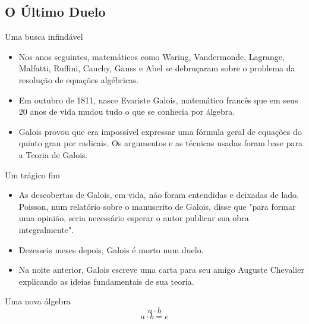 \documentclass[article]{beamer}%
\begin{document}
\subsection{O Último Duelo}
\begin{frame}{Uma busca infindável}

\begin{itemize}[<+->]
    \item Nos anos seguintes, matemáticos como Waring, Vandermonde, Lagrange, Malfatti, Ruffini, Cauchy, Gauss e Abel se debruçaram sobre o problema da resolução de equações algébricas.

    \item Em outubro de 1811, nasce Evariste Galois, matemático francês que em seus 20 anos de vida mudou tudo o que se conhecia por álgebra.

    \item Galois provou que era impossível expressar uma fórmula geral de equações do quinto grau por radicais. Os argumentos e as técnicas usadas foram base para a Teoria de Galois.
\end{itemize}

\end{frame}

\begin{frame}{Um trágico fim}

\begin{itemize}[<+->]
    \item As descobertas de Galois, em vida, não foram entendidas e deixadas de lado. Poisson, num relatório sobre o manuscrito de Galois, disse que "para formar uma opinião, seria necessário esperar o autor publicar sua obra integralmente".

    \item Dezesseis meses depois, Galois é morto num duelo.

    \item Na noite anterior, Galois escreve uma carta para seu amigo Auguste Chevalier explicando as ideias fundamentais de sua teoria.
\end{itemize}

\end{frame}
\begin{frame}{Uma nova álgebra}
{
    \[ a\cdot b\]
}
{
    \[ a\cdot b=e\]
}
\end{frame}
\end{document}
